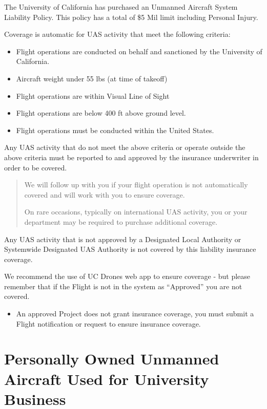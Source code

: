 \documentclass[
]{book}
\providecommand{\tightlist}{%
  \setlength{\itemsep}{0pt}\setlength{\parskip}{0pt}}
\begin{document}
The University of California has purchased an Unmanned Aircraft System Liability Policy. This policy has a total of \$5 Mil limit including Personal Injury.

Coverage is automatic for UAS activity that meet the following criteria:

\begin{itemize}
\tightlist
\item
  Flight operations are conducted on behalf and sanctioned by the University of California.
\item
  Aircraft weight under 55 lbs (at time of takeoff)
\item
  Flight operations are within Visual Line of Sight
\item
  Flight operations are below 400 ft above ground level.
\item
  Flight operations must be conducted within the United States.
\end{itemize}

Any UAS activity that do not meet the above criteria or operate outside the above criteria must be reported to and approved by the insurance underwriter in order to be covered.

\begin{quote}
We will follow up with you if your flight operation is not automatically covered and will work with you to ensure coverage.

On rare occasions, typically on international UAS activity, you or your department may be required to purchase additional coverage.
\end{quote}

Any UAS activity that is not approved by a Designated Local Authority or Systemwide Designated UAS Authority is not covered by this liability insurance coverage.

We recommend the use of UC Drones web app to ensure coverage - but please remember that if the Flight is not in the system as ``Approved'' you are not covered.

\begin{itemize}
\tightlist
\item
  An approved Project does not grant insurance coverage, you must submit a Flight notification or request to ensure insurance coverage.
\end{itemize}

\hypertarget{ss-personally-owned-UAS-coverage}{%
\section{Personally Owned Unmanned Aircraft Used for University Business}\label{ss-personally-owned-UAS-coverage}}
\end{document}
